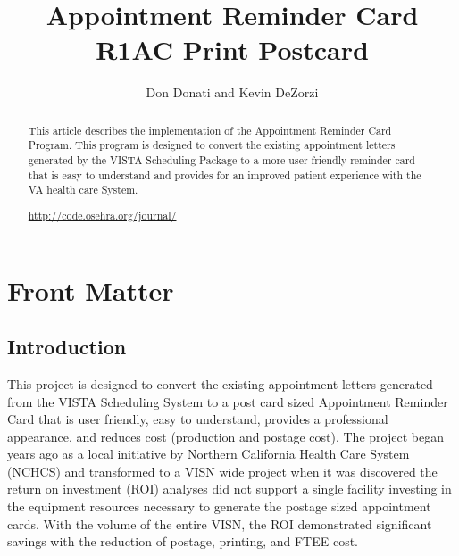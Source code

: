 \documentclass{OSEHRAArticle}
\title{Appointment Reminder Card\\R1AC Print Postcard}
\author{Don Donati and Kevin DeZorzi}
\newcommand{\OTJhandlerIDnumber}{5}
\begin{document}
%
%
\OTJhandlefooter{\OTJhandlerIDnumber}


\ifpdf
\else
\fi


\maketitle


\ifhtml
\chapter*{Front Matter\label{front}}
\fi


\begin{abstract}
\noindent
This article describes the implementation of the Appointment Reminder Card
Program. This program is designed to convert the existing appointment letters
generated by the VISTA Scheduling Package to a more user friendly reminder card
that is easy to understand and provides for an improved patient experience with
the VA health care System.
\begin{center}
\url{http://code.osehra.org/journal/}
\end{center}

\end{abstract}

\tableofcontents

\section{Introduction}

This project is designed to convert the existing appointment letters generated from the VISTA
Scheduling System to a post card sized Appointment Reminder Card that is user friendly, easy to
understand, provides a professional appearance, and reduces cost (production and postage cost).
The project began years ago as a local initiative by Northern California Health Care System (NCHCS)
and transformed to a VISN wide project when it was discovered the return on investment (ROI)
analyses did not support a single facility investing in the equipment resources necessary to generate
the postage sized appointment cards. With the volume of the entire VISN, the ROI demonstrated
significant savings with the reduction of postage, printing, and FTEE cost.
\end{document}
